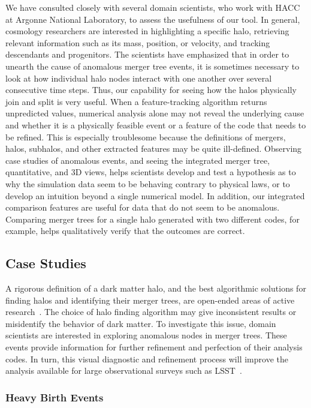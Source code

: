 We have consulted closely with several domain scientists, who work with HACC at Argonne National Laboratory, to assess the usefulness of our tool. In general, cosmology researchers are interested in highlighting a specific halo, retrieving relevant information such as its mass, position, or velocity, and tracking descendants and progenitors. The scientists have emphasized that in order to unearth the cause of anomalous merger tree events, it is sometimes necessary to look at how individual halo nodes interact with one another over several consecutive time steps. Thus, our capability for seeing how the halos physically join and split is very useful. When a feature-tracking algorithm returns unpredicted values, numerical analysis alone may not reveal the underlying cause and whether it is a physically feasible event or a feature of the code that needs to be refined. This is especially troublesome because the definitions of mergers, halos, subhalos, and other extracted features may be quite ill-defined. Observing case studies of anomalous events, and seeing the integrated merger tree, quantitative, and 3D views, helps scientists develop and test a hypothesis as to why the simulation data seem to be behaving contrary to physical laws, or to develop an intuition beyond a single numerical model. In addition, our integrated comparison features are useful for data that do not seem to be anomalous. Comparing merger trees for a single halo generated with two different codes, for example, helps qualitatively verify that the outcomes are correct. 

\subsection{Case Studies}

A rigorous definition of a dark matter halo, and the best algorithmic solutions for finding halos and identifying their merger trees, are open-ended areas of active research~\cite{Knebe:2011}. The choice of halo finding algorithm may give inconsistent results or misidentify the behavior of dark matter. To investigate this issue, domain scientists are interested in exploring anomalous nodes in merger trees. These events provide information for further refinement and perfection of their analysis codes. In turn, this visual diagnostic and refinement process will improve the analysis available for large observational surveys such as LSST~\cite{LSST}.

\subsubsection{Heavy Birth Events}

